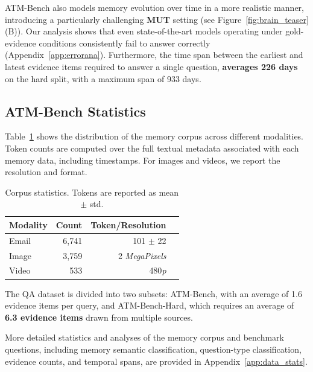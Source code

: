 \documentclass{article}
\theoremstyle{plain}
\theoremstyle{definition}
\theoremstyle{remark}
\begin{document}
ATM-Bench also models memory evolution over time in a more realistic manner, introducing a particularly challenging \textbf{MUT} setting (see Figure~\ref{fig:brain_teaser}(B)).
Our analysis shows that even state-of-the-art models operating under gold-evidence conditions consistently fail to answer correctly (Appendix~\ref{app:errorana}). Furthermore, the time span between the earliest and latest evidence items required to answer a single question, \textbf{averages 226 days} on the hard split, with a maximum span of 933 days.
\subsection{ATM-Bench Statistics}
Table~\ref{tab:memory-item-stats} shows the distribution of the memory corpus across different modalities.
Token counts are computed over the full textual metadata associated with each memory data, including timestamps.
For images and videos, we report the resolution and format.
\begin{table}[htbp]
\centering
\small
\caption{Corpus statistics. Tokens are reported as mean $\pm$ std.}
\setlength{\tabcolsep}{6pt}
\begin{tabular}{lrrr}
\toprule
Modality & Count & Token/Resolution \\
\midrule
Email & 6{,}741 & 101 $\pm$ 22 \\
Image & 3{,}759 & 2 \textit{MegaPixels} \\
Video &   533 & 480\textit{p} \\
\bottomrule
\end{tabular}
\label{tab:memory-item-stats}
\end{table}



The QA dataset is divided into two subsets: ATM-Bench, with an average of 1.6 evidence items per query, and ATM-Bench-Hard, which requires an average of \textbf{6.3 evidence items} drawn from multiple sources.

More detailed statistics and analyses of the memory corpus and benchmark questions, including memory semantic classification, question-type classification, evidence counts, and temporal spans, are provided in Appendix~\ref{app:data_stats}.

\end{document}
